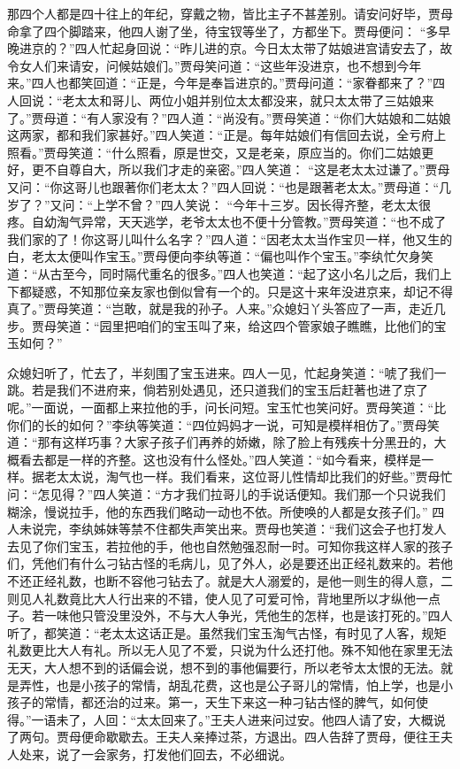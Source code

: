 \begin{parag}
    那四个人都是四十往上的年纪，穿戴之物，皆比主子不甚差别。请安问好毕，贾母命拿了四个脚踏来，他四人谢了坐，待宝钗等坐了，方都坐下。贾母便问： “多早晚进京的？”四人忙起身回说：“昨儿进的京。今日太太带了姑娘进宫请安去了，故令女人们来请安，问候姑娘们。”贾母笑问道：“这些年没进京，也不想到今年来。”四人也都笑回道：“正是，今年是奉旨进京的。”贾母问道：“家眷都来了？”四人回说：“老太太和哥儿、两位小姐并别位太太都没来，就只太太带了三姑娘来了。”贾母道：“有人家没有？”四人道：“尚没有。”贾母笑道：“你们大姑娘和二姑娘这两家，都和我们家甚好。”四人笑道：“正是。每年姑娘们有信回去说，全亏府上照看。”贾母笑道：“什么照看，原是世交，又是老亲，原应当的。你们二姑娘更好，更不自尊自大，所以我们才走的亲密。”四人笑道： “这是老太太过谦了。”贾母又问：“你这哥儿也跟著你们老太太？”四人回说：“也是跟著老太太。”贾母道：“几岁了？”又问：“上学不曾？”四人笑说： “今年十三岁。因长得齐整，老太太很疼。自幼淘气异常，天天逃学，老爷太太也不便十分管教。”贾母笑道：“也不成了我们家的了！你这哥儿叫什么名字？”四人道：“因老太太当作宝贝一样，他又生的白，老太太便叫作宝玉。”贾母便向李纨等道：“偏也叫作个宝玉。”李纨忙欠身笑道：“从古至今，同时隔代重名的很多。”四人也笑道：“起了这小名儿之后，我们上下都疑惑，不知那位亲友家也倒似曾有一个的。只是这十来年没进京来，却记不得真了。”贾母笑道：“岂敢，就是我的孙子。人来。”众媳妇丫头答应了一声，走近几步。贾母笑道：“园里把咱们的宝玉叫了来，给这四个管家娘子瞧瞧，比他们的宝玉如何？”
\end{parag}


\begin{parag}
    众媳妇听了，忙去了，半刻围了宝玉进来。四人一见，忙起身笑道：“唬了我们一跳。若是我们不进府来，倘若别处遇见，还只道我们的宝玉后赶著也进了京了呢。”一面说，一面都上来拉他的手，问长问短。宝玉忙也笑问好。贾母笑道：“比你们的长的如何？”李纨等笑道：“四位妈妈才一说，可知是模样相仿了。”贾母笑道：“那有这样巧事？大家子孩子们再养的娇嫩，除了脸上有残疾十分黑丑的，大概看去都是一样的齐整。这也没有什么怪处。”四人笑道：“如今看来，模样是一样。据老太太说，淘气也一样。我们看来，这位哥儿性情却比我们的好些。”贾母忙问：“怎见得？”四人笑道：“方才我们拉哥儿的手说话便知。我们那一个只说我们糊涂，慢说拉手，他的东西我们略动一动也不依。所使唤的人都是女孩子们。” 四人未说完，李纨姊妹等禁不住都失声笑出来。贾母也笑道：“我们这会子也打发人去见了你们宝玉，若拉他的手，他也自然勉强忍耐一时。可知你我这样人家的孩子们，凭他们有什么刁钻古怪的毛病儿，见了外人，必是要还出正经礼数来的。若他不还正经礼数，也断不容他刁钻去了。就是大人溺爱的，是他一则生的得人意，二则见人礼数竟比大人行出来的不错，使人见了可爱可怜，背地里所以才纵他一点子。若一味他只管没里没外，不与大人争光，凭他生的怎样，也是该打死的。”四人听了，都笑道：“老太太这话正是。虽然我们宝玉淘气古怪，有时见了人客，规矩礼数更比大人有礼。所以无人见了不爱，只说为什么还打他。殊不知他在家里无法无天，大人想不到的话偏会说，想不到的事他偏要行，所以老爷太太恨的无法。就是弄性，也是小孩子的常情，胡乱花费，这也是公子哥儿的常情，怕上学，也是小孩子的常情，都还治的过来。第一，天生下来这一种刁钻古怪的脾气，如何使得。”一语未了，人回：“太太回来了。”王夫人进来问过安。他四人请了安，大概说了两句。贾母便命歇歇去。王夫人亲捧过茶，方退出。四人告辞了贾母，便往王夫人处来，说了一会家务，打发他们回去，不必细说。
\end{parag}


